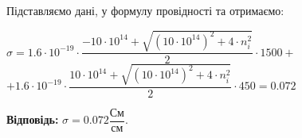 \documentclass[a4paper,12pt]{article}
\begin{document}
Підставляємо дані, у формулу провідності та отримаємо:\\
\begin{center}
$\sigma = 1.6\cdot10^{-19}\cdot \dfrac {-10\cdot 10^{14} +\sqrt{(10\cdot 10^{14})^2 + 4\cdot n_i^2}}{2} \cdot 1500 + $ \\
\vspace{0.3cm}
$+ 1.6\cdot10^{-19}\cdot \dfrac {10\cdot 10^{14} +\sqrt{(10\cdot 10^{14})^2 + 4\cdot n_i^2}}{2} \cdot 450 = 0.072$
\end{center}

\textbf{Відповідь:} 
$\sigma = 0.072 \dfrac{ \text{См}} {\text{см}}. $
\end{document}
